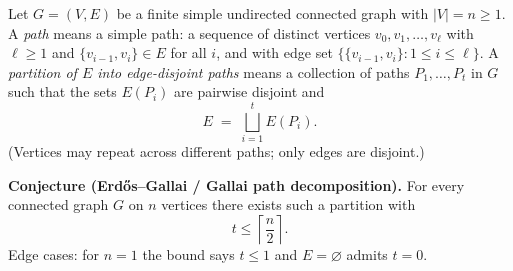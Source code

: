 Let $G=(V,E)$ be a finite simple undirected connected graph with $|V|=n\ge 1$.
A \emph{path} means a simple path: a sequence of distinct vertices $v_0,v_1,\dots,v_\ell$ with $\ell\ge 1$ and $\{v_{i-1},v_i\}\in E$ for all $i$, and with edge set $\{\{v_{i-1},v_i\}:1\le i\le \ell\}$.
A \emph{partition of $E$ into edge-disjoint paths} means a collection of paths $P_1,\dots,P_t$ in $G$ such that the sets $E(P_i)$ are pairwise disjoint and
\[
E\;=\;\bigsqcup_{i=1}^t E(P_i).
\]
(Vertices may repeat across different paths; only edges are disjoint.)

\smallskip
\noindent\textbf{Conjecture (Erd\H{o}s--Gallai / Gallai path decomposition).}
For every connected graph $G$ on $n$ vertices there exists such a partition with
\[
 t\le \left\lceil \frac n2\right\rceil.
\]
Edge cases: for $n=1$ the bound says $t\le 1$ and $E=\varnothing$ admits $t=0$.
